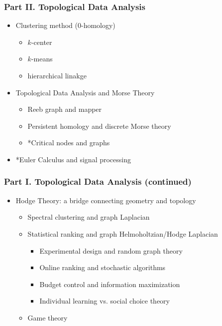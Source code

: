 \documentclass[10pt,mathserif]{beamer}
\begin{document}
\begin{frame}
\frametitle{Part II. Topological Data Analysis}
\begin{itemize}\itemsep=12pt
\item Clustering method (0-homology)
\vspace*{0.5em}
\begin{itemize}
\item $k$-center
\item $k$-means
\item hierarchical linakge
\end{itemize}
\vspace*{0.5em}
\item Topological Data Analysis and Morse Theory
\vspace*{0.5em}
\begin{itemize}
\item Reeb graph and mapper
\item Persistent homology and discrete Morse theory
\item *Critical nodes and graphs
\end{itemize}
\item *Euler Calculus and signal processing
\end{itemize}
\end{frame}

\begin{frame}
\frametitle{Part I. Topological Data Analysis (continued)}
\begin{itemize}\itemsep=12pt
\item Hodge Theory: a bridge connecting geometry and topology
\vspace*{0.5em}
\begin{itemize}
\item Spectral clustering and graph Laplacian
\item Statistical ranking and graph Helmoholtzian/Hodge Laplacian
\begin{itemize}
\item Experimental design and random graph theory
\item Online ranking and stochastic algorithms
\item Budget control and information maximization
\item Individual learning vs. social choice theory
\end{itemize}
\item Game theory
\end{itemize}
\end{itemize}
\end{frame}
\end{document}
